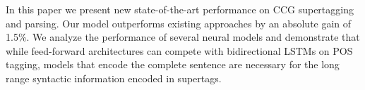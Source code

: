 In this paper we present new state-of-the-art performance on CCG supertagging and parsing.  Our model outperforms existing approaches by an absolute gain of 1.5\%.  We analyze the performance of several neural models and demonstrate that while feed-forward  architectures can compete with bidirectional LSTMs on POS tagging, models that encode the complete sentence are necessary for the long range syntactic information encoded in supertags.
